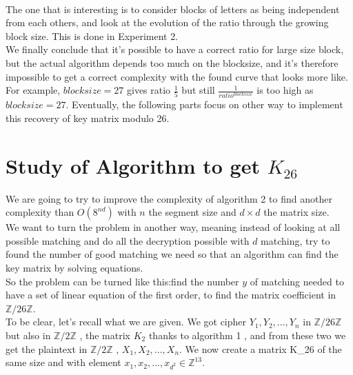 \documentclass{article}
\begin{document}
\\
The one that is interesting is to consider blocks of letters as being independent from each others, and look at the evolution of the ratio through the growing block size. This is done in Experiment 2.\\
We finally conclude that it's possible to have a correct ratio for large size block, but the actual algorithm depends too much on the blocksize, and it's therefore impossible to get a correct complexity with the found curve that looks more like. For example, $blocksize=27$ gives ratio $\frac{1}{5}$ but still $\frac{1}{ratio^{blocksize}}$ is too high as $blocksize = 27$.
Eventually, the following parts focus on other way to implement this recovery of key matrix modulo 26.\\

\section{Study of Algorithm to get $K_{26}$}
We are going to try to improve the complexity of algorithm 2 to find another complexity than $O(8^{nd})$ with $n$ the segment size and $d \times d$ the matrix size.\\
We want to turn the problem in another way, meaning instead of looking at all possible matching and do all the decryption possible with $d$ matching, try to found the number of good matching we need so that an algorithm can find the key matrix by solving equations.\\
So the problem can be turned like this:find the number $y$ of matching needed to have a set of linear equation of the first order, to find the matrix coefficient in $\mathbb{Z}/26\mathbb{Z}$.\\
To be clear, let's recall what we are given. We got cipher $Y_1 , Y_2 , ... , Y_n$ in $\mathbb{Z}/26\mathbb{Z}$ but also in $\mathbb{Z}/2\mathbb{Z}$ , the matrix $K_2$ thanks to algorithm 1 , and from these two we get the plaintext in $\mathbb{Z}/2\mathbb{Z}$ , $X_1,X_2,...,X_n$. We now create a matrix K_{26} of the same size and with element $x_1 , x_2 , ... , x_{d^2} \in \mathbb{Z}^{13}$.
\end{document}
